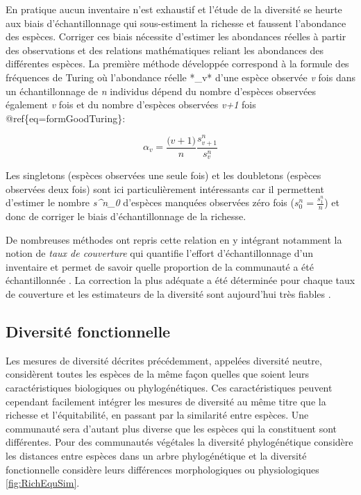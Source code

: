 \documentclass[
  11pt,
  french,
  A4paper,
  extrafontsizes,onecolumn,openright
  ]{memoir}
\begin{document}
En pratique aucun inventaire n'est exhaustif et l'étude de la diversité
se heurte aux biais d'échantillonnage qui sous-estiment la richesse et
faussent l'abondance des espèces. Corriger ces biais nécessite d'estimer
les abondances réelles à partir des observations et des relations
mathématiques reliant les abondances des différentes espèces. La
première méthode développée correspond à la formule des fréquences de
Turing \autocite{Good1953} où l'abondance réelle *\alpha\_v* d'une
espèce observée \emph{v} fois dans un échantillonnage de \emph{n}
individus dépend du nombre d'espèces observées également \emph{v} fois
et du nombre d'espèces observées \emph{v+1} fois
@ref\{eq=formGoodTuring\}:

\begin{equation}
\alpha_v=\frac{\big(v+1\big)}{n}\frac{s^n_{v+1}}{s^n_v}
\label{eq:formGoodTuring}
\end{equation}

Les singletons (espèces observées une seule fois) et les doubletons
(espèces observées deux fois) sont ici particulièrement intéressants car
il permettent d'estimer le nombre \emph{s\^{}n\_0} d'espèces manquées
observées zéro fois (\(s^n_0=\frac{s^n_1}{n}\)) et donc de corriger le
biais d'échantillonnage de la richesse.

De nombreuses méthodes ont repris cette relation en y intégrant
notamment la notion de \emph{taux de couverture} qui quantifie l'effort
d'échantillonnage d'un inventaire et permet de savoir quelle proportion
de la communauté a été échantillonnée \autocite{Dauby2012}. La
correction la plus adéquate a été déterminée pour chaque taux de
couverture et les estimateurs de la diversité sont aujourd'hui très
fiables \autocites{Chao2015}{Marcon2015b}.

\subsection{Diversité fonctionnelle}\label{diversite-fonctionnelle}

Les mesures de diversité décrites précédemment, appelées diversité
neutre, considèrent toutes les espèces de la même façon quelles que
soient leurs caractéristiques biologiques ou phylogénétiques. Ces
caractéristiques peuvent cependant facilement intégrer les mesures de
diversité au même titre que la richesse et l'équitabilité, en passant
par la similarité entre espèces. Une communauté sera d'autant plus
diverse que les espèces qui la constituent sont différentes. Pour des
communautés végétales la diversité phylogénétique considère les
distances entre espèces dans un arbre phylogénétique et la diversité
fonctionnelle considère leurs différences morphologiques ou
physiologiques \ref{fig:RichEquSim}.
\end{document}
